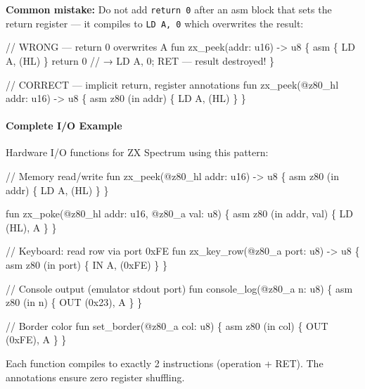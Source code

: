 \documentclass[
  11pt,
]{article}
\newenvironment{Shaded}{\begin{snugshade}}{\end{snugshade}}
\newcommand{\NormalTok}[1]{#1}
\begin{document}
\textbf{Common mistake:} Do not add \texttt{return\ 0} after an asm
block that sets the return register --- it compiles to
\texttt{LD\ A,\ 0} which overwrites the result:

\begin{Shaded}
\begin{Highlighting}[]
\NormalTok{// WRONG — return 0 overwrites A}
\NormalTok{fun zx\_peek(addr: u16) {-}\textgreater{} u8 \{}
\NormalTok{    asm \{ LD A, (HL) \}}
\NormalTok{    return 0           // → LD A, 0; RET — result destroyed!}
\NormalTok{\}}

\NormalTok{// CORRECT — implicit return, register annotations}
\NormalTok{fun zx\_peek(@z80\_hl addr: u16) {-}\textgreater{} u8 \{}
\NormalTok{    asm z80 (in addr) \{ LD A, (HL) \}}
\NormalTok{\}}
\end{Highlighting}
\end{Shaded}

\hypertarget{complete-io-example}{%
\paragraph{Complete I/O Example}\label{complete-io-example}}

Hardware I/O functions for ZX Spectrum using this pattern:

\begin{Shaded}
\begin{Highlighting}[]
\NormalTok{// Memory read/write}
\NormalTok{fun zx\_peek(@z80\_hl addr: u16) {-}\textgreater{} u8 \{}
\NormalTok{    asm z80 (in addr) \{ LD A, (HL) \}}
\NormalTok{\}}

\NormalTok{fun zx\_poke(@z80\_hl addr: u16, @z80\_a val: u8) \{}
\NormalTok{    asm z80 (in addr, val) \{ LD (HL), A \}}
\NormalTok{\}}

\NormalTok{// Keyboard: read row via port 0xFE}
\NormalTok{fun zx\_key\_row(@z80\_a port: u8) {-}\textgreater{} u8 \{}
\NormalTok{    asm z80 (in port) \{ IN A, (0xFE) \}}
\NormalTok{\}}

\NormalTok{// Console output (emulator stdout port)}
\NormalTok{fun console\_log(@z80\_a n: u8) \{}
\NormalTok{    asm z80 (in n) \{ OUT (0x23), A \}}
\NormalTok{\}}

\NormalTok{// Border color}
\NormalTok{fun set\_border(@z80\_a col: u8) \{}
\NormalTok{    asm z80 (in col) \{ OUT (0xFE), A \}}
\NormalTok{\}}
\end{Highlighting}
\end{Shaded}

Each function compiles to exactly 2 instructions (operation + RET). The
annotations ensure zero register shuffling.
\end{document}
